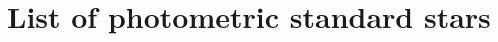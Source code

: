 \documentclass[a4paper, 11pt, fleqn]{memoir}
\begin{document}


















\backmatter

\appendix {}

\chapter{List of photometric standard stars}
\label{ch:photometric-standard-stars}
\end{document}
